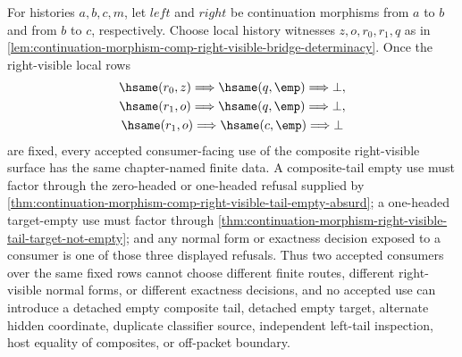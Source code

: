 \begin{corollary}
\label{cor:continuation-morphism-comp-right-visible-consumer-determinacy}
For histories $a,b,c,m$, let $left$ and $right$ be continuation morphisms from
$a$ to $b$ and from $b$ to $c$, respectively. Choose local history witnesses
$z,o,r_0,r_1,q$ as in
\autoref{lem:continuation-morphism-comp-right-visible-bridge-determinacy}. Once
the right-visible local rows
$$
\begin{gathered}
\hsame(r_0,z)
\Longrightarrow
\hsame(q,\emp)
\Longrightarrow \bot,\\
\hsame(r_1,o)
\Longrightarrow
\hsame(q,\emp)
\Longrightarrow \bot,\\
\hsame(r_1,o)
\Longrightarrow
\hsame(c,\emp)
\Longrightarrow \bot
\end{gathered}
$$
are fixed, every accepted consumer-facing use of the composite right-visible
surface has the same chapter-named finite data. A composite-tail empty use must
factor through the zero-headed or one-headed refusal supplied by
\autoref{thm:continuation-morphism-comp-right-visible-tail-empty-absurd}; a
one-headed target-empty use must factor through
\autoref{thm:continuation-morphism-right-visible-tail-target-not-empty}; and
any normal form or exactness decision exposed to a consumer is one of those
three displayed refusals. Thus two accepted consumers over the same fixed rows
cannot choose different finite routes, different right-visible normal forms, or
different exactness decisions, and no accepted use can introduce a detached
empty composite tail, detached empty target, alternate hidden coordinate,
duplicate classifier source, independent left-tail inspection, host equality of
composites, or off-packet boundary.
\end{corollary}
